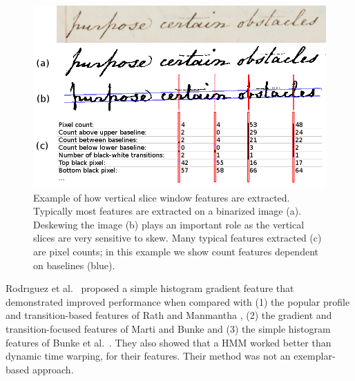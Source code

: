 \documentclass[ms,electronic,twosidetoc,letterpaper,chaptercenter,parttop,lof,lot]{byumsphd}
\begin{document}
\begin{figure}[t]
    \centering
    \includegraphics[width=.99\textwidth]{vertwind}
    \caption{Example of how vertical slice window features are extracted. Typically most features are extracted on a binarized image (a). Deskewing the image (b) plays an important role as the vertical slices are very sensitive to skew. Many typical features extracted (c) are pixel counts; in this example we show count features dependent on baselines (blue).}
    \label{fig:vertslice}
\end{figure}

Rodr{\i}guez et al.~\cite{Rodrıguez2008} proposed a simple histogram gradient feature that demonstrated improved performance when compared with (1) the popular profile and transition-based features of Rath and Manmantha \cite{Rath2003}, (2) the gradient and transition-focused features of Marti and Bunke \cite{Marti2001} and (3) the simple histogram features of Bunke et al.~\cite{Bunke2004}. They also showed that a HMM worked better than dynamic time warping, for their features. Their method was not an exemplar-based approach.
\end{document}
